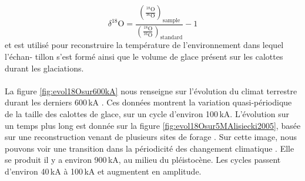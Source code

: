 \begin{equation}\label{d18O}
	\delta^{18}\text{O} = 
	\frac
	{\left(\frac{^{18}\text{O}}{^{16}\text{O}}\right)_{\text{sample}}}
	{\left(\frac{^{18}\text{O}}{^{16}\text{O}}\right)_{\text{standard}}}
	-1 
\end{equation}
et est utilisé pour reconstruire la température de l'environnement dans lequel l'échan- tillon s'est formé ainsi que le volume de glace présent sur les calottes durant les glaciations.

\paragraph{} La figure \ref{fig:evol18Osur600kA} nous renseigne sur l'évolution du climat terrestre durant les derniers 600\,kA \cite{schmidt1999}. Ces données montrent la variation quasi-périodique de la taille des calottes de glace, sur un cycle d'environ 100\,kA. L'évolution sur un temps plus long est donnée sur la figure \ref{fig:evol18Osur5MAlisiecki2005}, basée sur une reconstruction venant de plusieurs sites de forage \cite{lisiecki2005}. Sur cette image, nous pouvons voir une transition dans la périodicité des changement climatique \cite{wiki_mid_pleistocene_transition} \cite{huggett} . Elle se produit il y a environ 900\,kA, au milieu du pléistocène. Les cycles passent d'environ 40\,kA à 100\,kA et augmentent en amplitude. 
